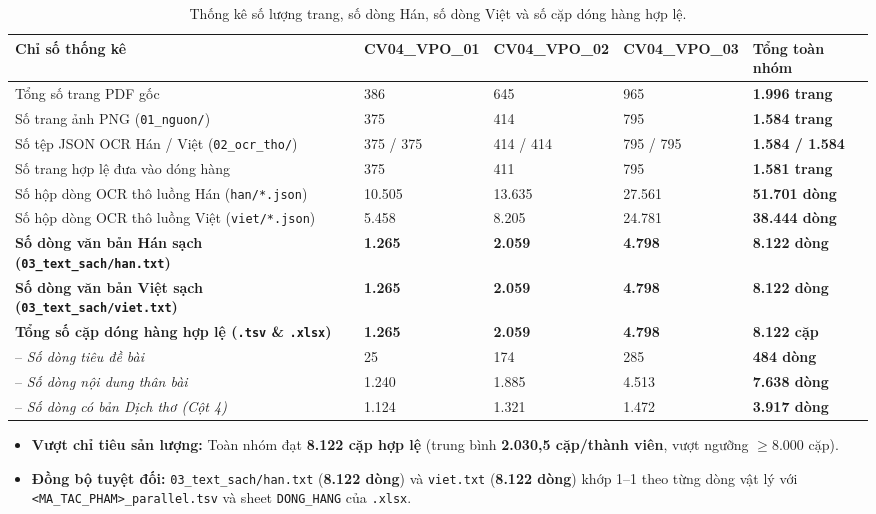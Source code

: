 \documentclass[11pt,a4paper]{article}
\begin{document}
\vspace{0.15em}
\begin{table}[h!]
\centering
\small
\begin{tabular}{L{5.6cm} C{2.1cm} C{2.1cm} C{2.1cm} C{2.5cm}}
\toprule
\textbf{Chỉ số thống kê} & \textbf{CV04\_VPO\_01} & \textbf{CV04\_VPO\_02} & \textbf{CV04\_VPO\_03} & \textbf{Tổng toàn nhóm} \\
\midrule
Tổng số trang PDF gốc & 386 & 645 & 965 & \textbf{1.996 trang} \\
Số trang ảnh PNG (\texttt{01\_nguon/}) & 375 & 414 & 795 & \textbf{1.584 trang} \\
Số tệp JSON OCR Hán / Việt (\texttt{02\_ocr\_tho/}) & 375 / 375 & 414 / 414 & 795 / 795 & \textbf{1.584 / 1.584} \\
Số trang hợp lệ đưa vào dóng hàng & 375 & 411 & 795 & \textbf{1.581 trang} \\
\midrule
Số hộp dòng OCR thô luồng Hán (\texttt{han/*.json}) & 10.505 & 13.635 & 27.561 & \textbf{51.701 dòng} \\
Số hộp dòng OCR thô luồng Việt (\texttt{viet/*.json}) & 5.458 & 8.205 & 24.781 & \textbf{38.444 dòng} \\
\midrule
\textbf{Số dòng văn bản Hán sạch (\texttt{03\_text\_sach/han.txt})} & \textbf{1.265} & \textbf{2.059} & \textbf{4.798} & \textbf{8.122 dòng} \\
\textbf{Số dòng văn bản Việt sạch (\texttt{03\_text\_sach/viet.txt})} & \textbf{1.265} & \textbf{2.059} & \textbf{4.798} & \textbf{8.122 dòng} \\
\midrule
\textbf{Tổng số cặp dóng hàng hợp lệ (\texttt{.tsv} \& \texttt{.xlsx})} & \textbf{1.265} & \textbf{2.059} & \textbf{4.798} & \textbf{8.122 cặp} \\
\quad -- \textit{Số dòng tiêu đề bài} & 25 & 174 & 285 & \textbf{484 dòng} \\
\quad -- \textit{Số dòng nội dung thân bài} & 1.240 & 1.885 & 4.513 & \textbf{7.638 dòng} \\
\quad -- \textit{Số dòng có bản Dịch thơ (Cột 4)} & 1.124 & 1.321 & 1.472 & \textbf{3.917 dòng} \\
\bottomrule
\end{tabular}
\caption{Thống kê số lượng trang, số dòng Hán, số dòng Việt và số cặp dóng hàng hợp lệ.}
\end{table}

\begin{itemize}
    \item \textbf{Vượt chỉ tiêu sản lượng:} Toàn nhóm đạt \textbf{8.122 cặp hợp lệ} (trung bình \textbf{2.030,5 cặp/thành viên}, vượt ngưỡng $\ge 8.000$ cặp).
    \item \textbf{Đồng bộ tuyệt đối:} \texttt{03\_text\_sach/han.txt} (\textbf{8.122 dòng}) và \texttt{viet.txt} (\textbf{8.122 dòng}) khớp 1--1 theo từng dòng vật lý với \texttt{<MA\_TAC\_PHAM>\_parallel.tsv} và sheet \texttt{DONG\_HANG} của \texttt{.xlsx}.
\end{itemize}
\end{document}
